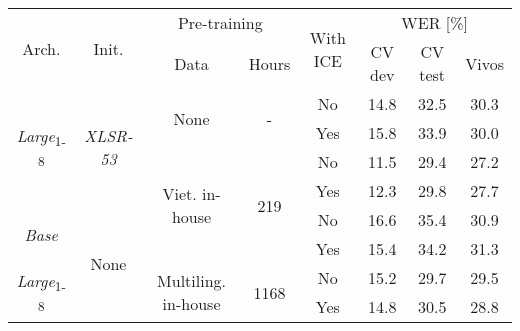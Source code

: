 \begin{table}[!ht]
\captionsetup{font=Large}
\centering
\begin{adjustbox}{width=0.8\columnwidth,center}
\begin{tabular}{|c|c|c|c|c|c|c|c|} 
\hline
\multirow{2}{*}{Arch.}             & \multirow{2}{*}{Init.}            & \multicolumn{2}{c|}{Pre-training}                            & \multirow{2}{*}{With ICE} & \multicolumn{3}{c|}{WER [\%]}  \\ 
\cline{3-4}\cline{6-8}
                                   &                                   & Data                                 & Hours                 &                           & CV dev & CV test & Vivos       \\ 
\hline
\multirow{4}{*}{\textit{Large}\textsubscript{1-8}} & \multirow{4}{*}{\textit{XLSR-53}} & \multirow{2}{*}{None}                & \multirow{2}{*}{-}    & No                        & 14.8   & 32.5    & 30.3        \\ 
\cline{5-8}
                                   &                                   &                                      &                       & Yes                       & 15.8   & 33.9    & 30.0        \\ 
\cline{3-8}
                                   &                                   & \multirow{4}{*}{Viet. in-house}      & \multirow{4}{*}{219}  & No                        & 11.5   & 29.4    & 27.2        \\ 
\cline{5-8}
                                   &                                   &                                      &                       & Yes                       & 12.3   & 29.8    & 27.7        \\ 
\cline{1-2}\cline{5-8}
\multirow{2}{*}{\textit{Base}}     & \multirow{6}{*}{None}             &                                      &                       & No                        & 16.6   & 35.4    & 30.9        \\ 
\cline{5-8}
                                   &                                   &                                      &                       & Yes                       & 15.4   & 34.2    & 31.3        \\ 
\cline{1-1}\cline{3-8}
\multirow{6}{*}{\textit{Large}\textsubscript{1-8}} &                                   & \multirow{2}{*}{Multiling. in-house} & \multirow{6}{*}{1168} & No                        & 15.2   & 29.7    & 29.5        \\ 
\cline{5-8}
                                   &                                   &                                      &                       & Yes                       & 14.8   & 30.5    & 28.8        \\ 

\end{tabular}
\end{adjustbox}
\end{table}

